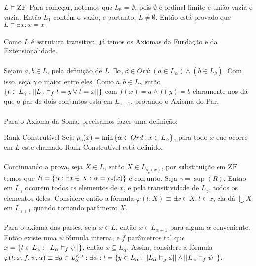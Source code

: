         \begin{theorem}{$L\vDash\text{\sc ZF}$}
                Para começar, notemos que $L_\emptyset = \emptyset$, pois $\emptyset$ é ordinal limite e união vazia é vazia. Então $L_1$ contém o vazio, e portanto, 
                $L\not = \emptyset$. Então está provado que $L\vDash \exists x: x=x$
            \paragraph{}
                Como $L$ é estrutura transitiva, já temos os Axiomas da Fundação e da Extensionalidade.
            \paragraph{}
                Sejam $a, b\in L$, pela definição de $L$, $\exists \alpha,\beta\in Ord:(a\in L_\alpha)\land(b\in L_\beta)$. Com isso, seja $\gamma$ o maior entre 
                eles. Como $a,b\in L_\gamma$ então $\SET{t\in L_\gamma: ||L_\gamma\vDash_f t = y \lor t = x||}$ com $f(x) = a \land f(y) = b$ claramente nos dá que 
                o par de dois conjuntos está em $L_{\gamma+1}$, provando o Axioma do Par.
            \paragraph{}
                Para o Axioma da Soma, precisamos fazer uma definição:
            \begin{definition}{Rank Construtível}
                Seja $\rho_c(x)=\min\SET{\alpha\in Ord: x\in L_\alpha}$, para todo $x$ que ocorre em $L$ este chamado Rank Construtível está definido.
            \end{definition}
            \paragraph{}
                Continuando a prova, seja $X\in L$, então $X\in L_{\rho_c(x)}$, por substituição em $\text{\sc ZF}$ temos que $R = \SET{\alpha : \exists x\in X:\alpha = \rho_c(x)}$ 
                é conjunto. Seja $\gamma = \sup(R)$, Então em $L_\gamma$ ocorrem todos os elementos de $x$, e pela transitividade de $L_\gamma$, todos os elementos deles.
                Considere então a fórmula $\varphi(t; X)\equiv \exists x\in X: t\in x$, ela dá $\bigcup X$ em $L_{\gamma+1}$ quando tomando parâmetro $X$.
            \paragraph{}
                Para o axioma das partes, seja $x\in L$, então $x\in L_{\alpha+1}$ para algum $\alpha$ conveniente. Então existe uma $\psi$ fórmula interna, e $f$ 
                parâmetros tal que $x = \SET{t \in L_\alpha : ||L_\alpha \vDash_f \psi||}$, então $x\subseteq L_\alpha$. Assim, considere a fórmula $\varphi(
                t;x,f,\psi,\alpha)\equiv\exists g\in L_\alpha^{<\omega}:\exists\phi:t=\SET{y\in L_\alpha:||L_\alpha\vDash_g\phi||\land||L_\alpha\vDash_f\psi||}$.

\end{theorem}
